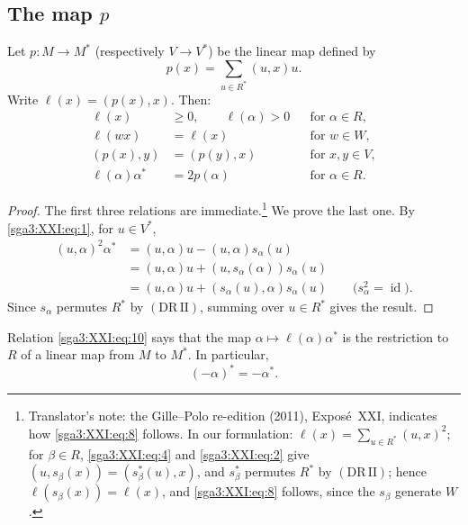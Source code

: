 \subsection{The map \texorpdfstring{\(p\)}{p}}

\begin{lemma}\label{sga3:XXI:1.2.1}
Let \(p:M\to M^\ast\) (respectively \(V\to V^\ast\)) be the linear map
defined by
\begin{equation}
 p(x)=\sum_{u\in R^\ast}(u,x)u.
 \tag{6}\label{sga3:XXI:eq:6}
\end{equation}
Write \(\ell(x)=(p(x),x)\). Then:
\begin{align}
 \ell(x)&\geq0,\qquad \ell(\alpha)>0
     &&\text{for }\alpha\in R,
 \tag{7}\label{sga3:XXI:eq:7}\\
 \ell(wx)&=\ell(x)
     &&\text{for }w\in W,
 \tag{8}\label{sga3:XXI:eq:8}\\
 (p(x),y)&=(p(y),x)
     &&\text{for }x,y\in V,
 \tag{9}\label{sga3:XXI:eq:9}\\
 \ell(\alpha)\alpha^\ast&=2p(\alpha)
     &&\text{for }\alpha\in R.
 \tag{10}\label{sga3:XXI:eq:10}
\end{align}
\end{lemma}

\begin{proof}
The first three relations are immediate.\footnote{Translator's note: the Gille--Polo re-edition (2011), Exposé~XXI, indicates how
\eqref{sga3:XXI:eq:8} follows. In our formulation:
\(\ell(x)=\sum_{u\in R^\ast}(u,x)^2\); for \(\beta\in R\), \eqref{sga3:XXI:eq:4} and
\eqref{sga3:XXI:eq:2} give \((u,s_\beta(x))=(s_\beta^\ast(u),x)\), and \(s_\beta^\ast\)
permutes \(R^\ast\) by \((\mathrm{DR\,II})\); hence \(\ell(s_\beta(x))=\ell(x)\), and
\eqref{sga3:XXI:eq:8} follows, since the \(s_\beta\) generate \(W\).}
We prove the last one. By \eqref{sga3:XXI:eq:1}, for \(u\in V^\ast\),
\begin{align*}
 (u,\alpha)^2\alpha^\ast
  &=(u,\alpha)u-(u,\alpha)s_\alpha(u)\\
  &=(u,\alpha)u+(u,s_\alpha(\alpha))s_\alpha(u)\\
  &=(u,\alpha)u+(s_\alpha(u),\alpha)s_\alpha(u)
       \qquad\bigl(s_\alpha^2=\operatorname{id}\bigr).
\end{align*}
Since \(s_\alpha\) permutes \(R^\ast\) by
\((\mathrm{DR\,II})\), summing over \(u\in R^\ast\) gives the result.
\end{proof}

\begin{scholium}\label{sga3:XXI:1.2.2}
Relation \eqref{sga3:XXI:eq:10} says that the map
\(\alpha\mapsto\ell(\alpha)\alpha^\ast\) is the restriction to \(R\)
of a linear map from \(M\) to \(M^\ast\). In particular,
\[
 (-\alpha)^\ast=-\alpha^\ast.
\]
\end{scholium}

